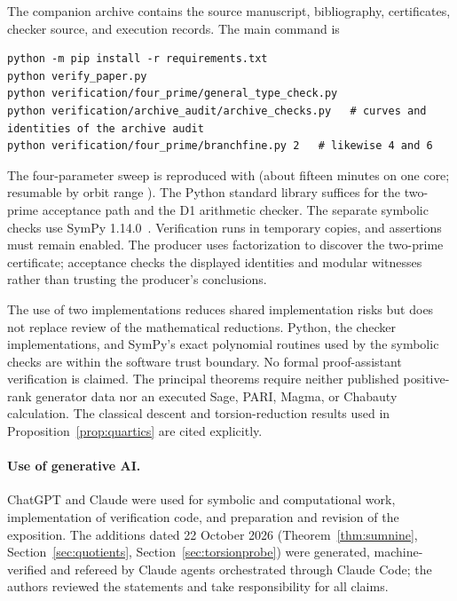 \documentclass[11pt,letterpaper]{article}
\theoremstyle{definition}\newtheorem{definition}[theorem]{Definition}
\theoremstyle{remark}\newtheorem{remark}[theorem]{Remark}
\begin{document}
The companion archive contains the source manuscript, bibliography, certificates, checker source, and execution records. The main command is
\begin{verbatim}
python -m pip install -r requirements.txt
python verify_paper.py
python verification/four_prime/general_type_check.py
python verification/archive_audit/archive_checks.py   # curves and identities of the archive audit
python verification/four_prime/branchfine.py 2   # likewise 4 and 6
\end{verbatim}
The four-parameter sweep is reproduced with  (about fifteen minutes on one core; resumable by orbit range ).
The Python standard library suffices for the two-prime acceptance path and the D1 arithmetic checker. The separate symbolic checks use SymPy 1.14.0~\cite{SymPy}. Verification runs in temporary copies, and assertions must remain enabled. The producer uses factorization to discover the two-prime certificate; acceptance checks the displayed identities and modular witnesses rather than trusting the producer's conclusions.

The use of two implementations reduces shared implementation risks but does not replace review of the mathematical reductions. Python, the checker implementations, and SymPy's exact polynomial routines used by the symbolic checks are within the software trust boundary. No formal proof-assistant verification is claimed. The principal theorems require neither published positive-rank generator data nor an executed Sage, PARI, Magma, or Chabauty calculation. The classical descent and torsion-reduction results used in Proposition~\ref{prop:quartics} are cited explicitly.

\paragraph{Use of generative AI.}
ChatGPT and Claude were used for symbolic and computational work, implementation of verification code, and preparation and revision of the exposition. The additions dated 22 October 2026 (Theorem~\ref{thm:sumnine}, Section~\ref{sec:quotients}, Section~\ref{sec:torsionprobe}) were generated, machine-verified and refereed by Claude agents orchestrated through Claude Code; the authors reviewed the statements and take responsibility for all claims.

\appendix



\end{document}
